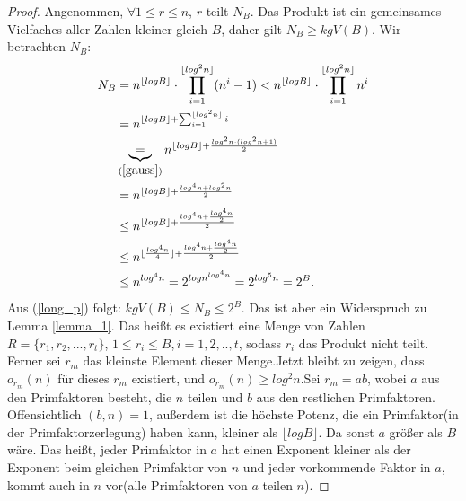 \documentclass[12pt,oneside]{article}
\theoremstyle{remark}
\theoremstyle{definition}
\begin{document}
\begin{proof}
Angenommen, $\forall 1 \leq r \leq n$, $r$ teilt $N_{B}$. Das Produkt ist ein gemeinsames Vielfaches aller Zahlen kleiner gleich $B$, daher gilt $N_{B} \geq kgV(B)$.\newline
Wir betrachten $N_{B}$:
\begin{equation}\label{long_p}
    \begin{split}
        \begin{aligned}
            N_{B} &= n^{\lfloor log B \rfloor } \cdot \prod_{i = 1}^{\lfloor log^2 n \rfloor} (n^i - 1)
                < n^{\lfloor log B \rfloor } \cdot \prod_{i = 1}^{\lfloor log^2 n \rfloor} n^i \\
                &= n^{\lfloor log B \rfloor + \sum_{i = 1}^{\lfloor log^2 n \rfloor } i}\\ 
                &\underbrace{=}_{(\ref{gauss})} n^{\lfloor log B \rfloor + \frac{log^2 n \cdot (log^2 n + 1)}{2}}  \\
                &= n^{\lfloor log B \rfloor + \frac{log^4 n + log^2 n}{2}}\\
                & \leq n^{\lfloor log B \rfloor + \frac{log^4 n + \frac{log^4 n}{2}}{2}}\\
                & \leq n^{\lfloor \frac{log^4 n}{4} \rfloor + \frac{log^4 n + \frac{log^4 n}{2}}{2}}\\
                & \leq n^{log^4 n} = 2^{log n^{log^4 n}} = 2^{log^5 n} = 2^{B}.
        \end{aligned}
    \end{split}
\end{equation}
Aus (\ref{long_p}) folgt: $kgV(B) \leq N_{B} \leq 2^B$. Das ist aber ein Widerspruch zu Lemma \ref{lemma_1}. Das heißt es existiert eine Menge von Zahlen $R = \{r_{1},r_{2},...,r_{t}\}$, $ 1 \leq r_i \leq B$,$\, i = 1,2, ..,t$, sodass $r_{i}$ das Produkt nicht teilt. Ferner sei $r_{m}$ das kleinste Element dieser Menge.\newline\newline Jetzt bleibt zu zeigen, dass $o_{r_{m}}(n)$ für dieses $r_{m}$ existiert, und $o_{r_{m}}(n) \geq log^2 n$.\newline\newline Sei $r_{m} = ab $, wobei $a$ aus den Primfaktoren besteht, die $n$ teilen und $b$ aus den restlichen Primfaktoren. Offensichtlich $(b,n) = 1$, außerdem ist die höchste Potenz, die ein Primfaktor(in der Primfaktorzerlegung) haben kann, kleiner als $\lfloor log B \rfloor$. Da sonst $a$ größer als $B$ wäre. Das heißt, jeder Primfaktor in $a$ hat einen Exponent kleiner als der Exponent beim gleichen Primfaktor von $n$ und jeder vorkommende Faktor in $a$, kommt auch in $n$ vor(alle Primfaktoren von $a$ teilen $n$).\newline\newline

\end{proof}
\end{document}
